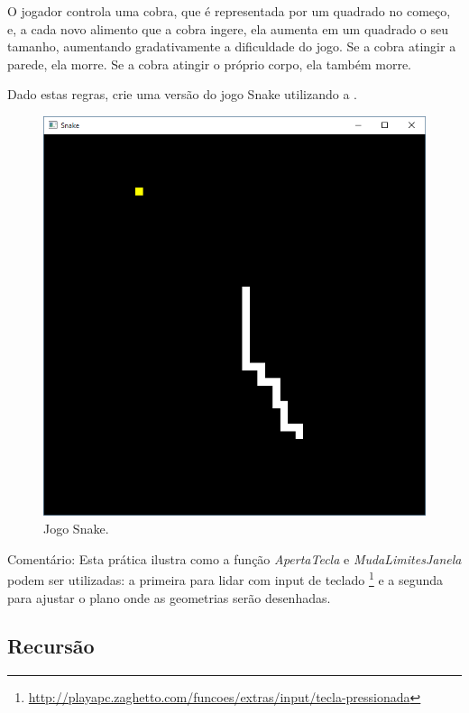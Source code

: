 \begin{renumerate}
  O jogador controla uma cobra, que é representada por um quadrado no começo, e, a cada novo alimento que a cobra ingere, ela aumenta em um quadrado o seu tamanho, aumentando gradativamente a dificuldade do jogo. Se a cobra atingir a parede, ela morre. Se a cobra atingir o próprio corpo, ela também morre.

  Dado estas regras, crie uma versão do jogo Snake utilizando a \playAPC.

  \label{ex:cap03_ex2}

  \begin{figure}[H]
    \centerline{\includegraphics[width=.25\textwidth]{img/cap3_ex10.png}}
    \caption{Jogo Snake.}
    \label{fig:cap03_ex2}
  \end{figure}
 Comentário: Esta prática ilustra como a função \emph{ApertaTecla} e \emph{MudaLimitesJanela} podem ser utilizadas: a primeira para lidar com input de teclado \footnote{\url{http://playapc.zaghetto.com/funcoes/extras/input/tecla-pressionada}} e a segunda para ajustar o plano onde as geometrias serão desenhadas.
%

\end{renumerate}

\subsection{Recursão}


